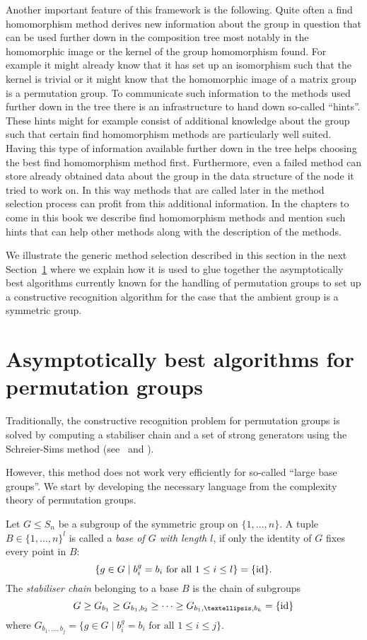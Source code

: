 Another important feature of this framework is the following. Quite often
a find homomorphism method derives new information about the group in
question that can be used further down in the composition tree most notably
in the homomorphic image or the kernel of the group homomorphism found.
For example it might already know that it has set up an isomorphism such
that the kernel is trivial or it might know that the homomorphic image of a
matrix group is a permutation group. To communicate such information to the
methods used further down in the tree there is an infrastructure to hand
down so-called ``hints''. These hints might for example consist of additional
%
knowledge about the group such that certain find homomorphism methods
are particularly well suited. Having this type of information available
further down in the tree helps choosing the best find homomorphism method
first. Furthermore, even a failed method can store already 
obtained data about the group in the data structure of the node it tried
to work on. In this way methods that are called later in the method
selection process can profit from this additional information. In the
chapters to come in this book we describe find homomorphism methods
and mention such hints that can help other methods along with the
description of the methods.

We illustrate the generic method selection described in this section
in the next Section~\ref{permgrps} where we explain how it is used to
glue together the asymptotically best algorithms currently known for
the handling of permutation groups to set up a constructive recognition
algorithm for the case that the ambient group is a symmetric group.


\section{Asymptotically best algorithms for permutation groups}
\label{permgrps}

Traditionally, the constructive recognition problem for permutation
groups is solved by computing a stabiliser chain and a set of strong
generators using the Schreier-Sims method (see~\cite{Si} and \cite{Ser}). 

However, this method does not work very efficiently for so-called
``large base groups''. We start by developing the necessary language
from the complexity theory of permutation groups.

\begin{Def}
%
Let $G \le S_n$ be a subgroup of the symmetric group on $\{1,\ldots,n\}$.
A tuple $B \in \{ 1, \ldots, n\}^l$ is called a \emph{base of $G$ with
length $l$}, if only the identity of $G$ fixes every point in $B$: 
\[ \{ g \in G \mid b_i^g = b_i \mbox{ for all } 1 \le i \le l \} = \{ \id \}. \]
The \emph{stabiliser chain} belonging to a base $B$ is the chain of
subgroups
\[ G \ge G_{b_1} \ge G_{b_1,b_2} \ge \cdots \ge G_{b_1,\ldots,b_k} =
\{\id\} \]
where $G_{b_1, \ldots, b_j} =
\{ g \in G \mid b_i^g = b_i \mbox{ for all } 1 \le i \le j \}$.
\end{Def}

